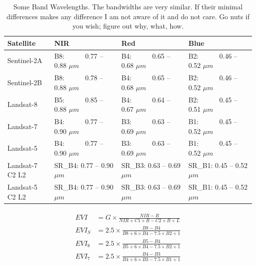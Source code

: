 \documentclass{article}
\newcommand{\EVI}{E\!V\!I}
\newcommand{\NIR}{N\!I\!R}
\begin{document}
\begin{table}[]
\centering
\caption{Some Band Wavelengths. The bandwidths are very similar. If their
minimal differences makes any difference I am not aware of it and do not care. 
Go nuts if you wish; figure out why, what, how.} 
\label{tab:SomeBandWavelengths}
\begin{tabular}{|l|l|l|l|}
\hline
\rowcolor{shadecolor} 
\small{Satellite} & 
\small{NIR} & 
\small{Red}  &
\small{Blue} \\
\hline
Sentinel-2A & B8:~~~~~~0.77 -- 0.88 $\mu m$ & B4:~~~~~~0.65 -- 0.68 $\mu m$ & B2:~~~~~~0.46 -- 0.52 $\mu m$\\ 
\hline
\rowcolor{aliceblue} 
Sentinel-2B & B8:~~~~~~0.78 -- 0.88 $\mu m$ & B4:~~~~~~0.65 -- 0.68 $\mu m$ & B2:~~~~~~0.46 -- 0.52 $\mu m$ \\ 
\hline
Landsat-8 & B5:~~~~~~0.85 -- 0.88 $\mu m$ & B4:~~~~~~0.64 -- 0.67 $\mu m$ & B2:~~~~~~0.45 -- 0.51 $\mu m$\\ 
\hline
\rowcolor{aliceblue} 
Landsat-7 & B4:~~~~~~0.77 -- 0.90 $\mu m$ & B3:~~~~~~0.63 -- 0.69 $\mu m$ & B1:~~~~~~0.45 -- 0.52 $\mu m$\\ 
\hline
Landsat-5 & B4:~~~~~~0.77 -- 0.90 $\mu m$  & B3:~~~~~~0.63 -- 0.69 $\mu m$ & B1:~~~~~~0.45 -- 0.52 $\mu m$\\ 
\hline
\rowcolor{aliceblue} 
Landsat-7 C2 L2 & SR\_B4: 0.77 -- 0.90 $\mu m$ & SR\_B3: 0.63 -- 0.69 $\mu m$ & SR\_B1: 0.45 -- 0.52 $\mu m$\\ 
\hline
Landsat-5 C2 L2 & SR\_B4: 0.77 -- 0.90 $\mu m$ & SR\_B3: 0.63 -- 0.69 $\mu m$ & SR\_B1: 0.45 -- 0.52 $\mu m$\\ 
\hline
\end{tabular}
\end{table}





\begin{gather}
\label{eq:EVILandsat8}
\begin{aligned}
\EVI &= G \times \frac{\NIR - R}{\NIR + C1 \times R - C2 \times B + L} \\
\EVI_S &= 2.5 \times \frac{B8 - B4}{B8 + 6 \times B4 - 7.5 \times B2 + 1}\\
\EVI_8 &= 2.5 \times \frac{B5 - B4}{B5 + 6 \times B4 - 7.5 \times B2 + 1} \\
\EVI_7 &= 2.5 \times \frac{B4 - B3}{B4 + 6 \times B3 - 7.5 \times B1 + 1}
\end{aligned}
\end{gather} 
\end{document}
